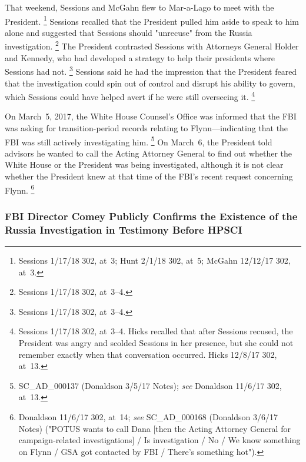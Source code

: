 That weekend, Sessions and McGahn flew to Mar-a-Lago to meet with the President.%
\footnote{Sessions 1/17/18 302, at~3;
Hunt 2/1/18 302, at~5;
McGahn 12/12/17 302, at~3.}
Sessions recalled that the President pulled him aside to speak to him alone and suggested that Sessions should "unrecuse" from the Russia investigation.%
\footnote{Sessions 1/17/18 302, at~3--4.}
The President contrasted Sessions with Attorneys General Holder and Kennedy, who had developed a strategy to help their presidents where Sessions had not.%
\footnote{Sessions 1/17/18 302, at~3--4.}
Sessions said he had the impression that the President feared that the investigation could spin out of control and disrupt his ability to govern, which Sessions could have helped avert if he were still overseeing it.%
\footnote{Sessions 1/17/18 302, at~3--4.
Hicks recalled that after Sessions recused, the President was angry and scolded Sessions in her presence, but she could not remember exactly when that conversation occurred.
Hicks 12/8/17 302, at~13.}

On March~5, 2017, the White House Counsel's Office was informed that the FBI was asking for transition-period records relating to Flynn---indicating that the FBI was still actively investigating him.%
\footnote{SC\_AD\_000137 (Donaldson 3/5/17 Notes);
\textit{see} Donaldson 11/6/17 302, at~13.}
On March~6, the President told advisors he wanted to call the Acting Attorney General to find out whether the White House or the President was being investigated, although it is not clear whether the President knew at that time of the FBI's recent request concerning Flynn.%
\footnote{Donaldson 11/6/17 302, at~14;
\textit{see} SC\_AD\_000168 (Donaldson 3/6/17 Notes) ("POTUS wants to call Dana [then the Acting Attorney General for campaign-related investigations] / Is investigation / No / We know something on Flynn / GSA got contacted by FBI / There's something hot").}

\subsubsection{FBI Director Comey Publicly Confirms the Existence of the Russia Investigation in Testimony Before HPSCI}

